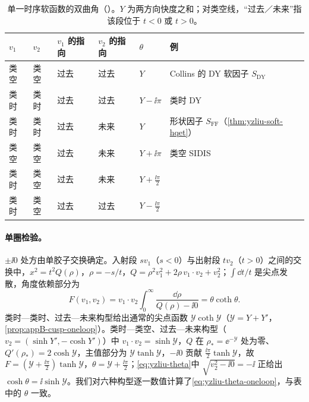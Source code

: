 \begin{table}[htbp]
\centering
\small
\renewcommand{\arraystretch}{1.1}
\begin{tabular}{@{}llllll@{}}
\toprule
$v_1$ & $v_2$ & $v_1$ 的指向 & $v_2$ 的指向 & $\theta$ & 例 \\
\midrule
类空 & 类空 & 过去 & 过去 & $Y$ & Collins 的 DY 软因子 $S_{\mathrm{DY}}$ \\
类时 & 类时 & 过去 & 过去 & $Y-\ii\pi$ & 类时 DY \\
类时 & 类时 & 过去 & 未来 & $Y$ & 形状因子 $S_{\mathrm{FF}}$（\cref{thm:yzliu-soft-hqet}） \\
类空 & 类空 & 过去 & 未来 & $Y+\ii\pi$ & 类空 SIDIS \\
类时 & 类空 & 过去 & 未来 & $Y+\frac{\ii\pi}{2}$ & \\
类时 & 类空 & 过去 & 过去 & $Y-\frac{\ii\pi}{2}$ & \\
\bottomrule
\end{tabular}
\caption{单一时序软函数的双曲角（\cite[表~1]{Liu:2022nnk}）。$Y$ 为两方向快度之和；对类空线，“过去／未来”指该段位于 $t<0$ 或 $t>0$。}
\label{tab:yzliu-theta}
\end{table}

\paragraph{单圈检验。}$\pm\ii0$ 处方由单胶子交换确定。入射段 $sv_1$（$s<0$）与出射段 $tv_2$（$t>0$）之间的交换中，$x^2=t^2Q(\rho)$，$\rho=-s/t$，$Q=\rho^2v_1^2+2\rho\,v_1\cdot v_2+v_2^2$；$\int\dd t/t$ 是尖点发散，角度依赖部分为
\begin{equation}\label{eq:yzliu-theta-oneloop}
F(v_1,v_2)=v_1\cdot v_2\int_0^\infty\frac{\dd\rho}{Q(\rho)-\ii0}=\theta\coth\theta .
\end{equation}
类时—类时、过去—未来构型给出通常的尖点函数 $\mathcal Y\coth\mathcal Y$（$\mathcal Y=Y+Y'$，\cref{prop:appB-cusp-oneloop}）。类时—类空、过去—未来构型（$v_2=(\sinh Y',-\cosh Y')$）中 $v_1\cdot v_2=\sinh\mathcal Y$，$Q$ 在 $\rho_*=\ee^{-\mathcal Y}$ 处为零、$Q'(\rho_*)=2\cosh\mathcal Y$，主值部分为 $\mathcal Y\tanh\mathcal Y$，$-\ii0$ 贡献 $\frac{\ii\pi}{2}\tanh\mathcal Y$，故 $F=(\mathcal Y+\frac{\ii\pi}{2})\tanh\mathcal Y$，$\theta=\mathcal Y+\frac{\ii\pi}2$；\cref{eq:yzliu-theta}中 $\sqrt{v_2^2-\ii0}=-\ii$ 正给出 $\cosh\theta=\ii\sinh\mathcal Y$。我们对六种构型逐一数值计算了\cref{eq:yzliu-theta-oneloop}，与表中的 $\theta$ 一致。

